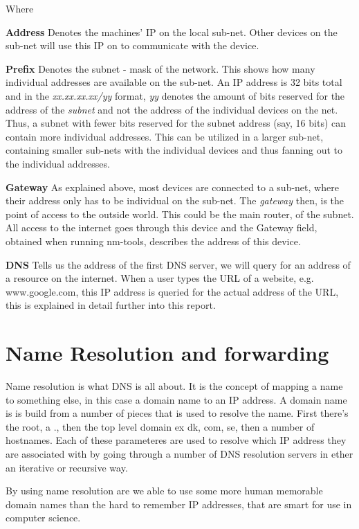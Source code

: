 Where 

\textbf{Address} 
Denotes the machines' IP on the local sub-net. Other devices on the sub-net will use this IP on to communicate with the device.

\textbf{Prefix} 
Denotes the subnet - mask of the network. This shows how many individual addresses are available on the sub-net. An IP address is 32 bits total and in the \textit{xx.xx.xx.xx/yy} format, \textit{yy} denotes the amount of bits reserved for the address of the \textit{subnet} and not the address of the individual devices on the net. Thus, a subnet with fewer bits reserved for the subnet address (say, 16 bits) can contain more individual addresses. This can be utilized in a larger sub-net, containing smaller sub-nets with the individual devices and thus fanning out to the individual addresses. 

\textbf{Gateway}
As explained above, most devices are connected to a sub-net, where their address only has to be individual on the sub-net. The \textit{gateway} then, is the point of access to the outside world. This could be the main router, of the subnet. All access to the internet goes through this device and the Gateway field, obtained when running nm-tools, describes the address of this device. 

\textbf{DNS}
Tells us the address of the first DNS server, we will query for an address of a resource on the internet. When a user types the URL of a website, e.g. www.google.com, this IP address is queried for the actual address of the URL, this is explained in detail further into this report.


\section{Name Resolution and forwarding}
Name resolution is what DNS is all about. It is the concept of mapping a name to something else, in this case a domain name to an IP address. A domain name is is build from a number of pieces that is used to resolve the name. First there's the root, a ., then the top level domain ex dk, com, se, then a number of hostnames. Each of these parameteres are used to resolve which IP address they are associated with by going through a number of DNS resolution servers in ether an iterative or recursive way.

By using name resolution are we able to use some more human memorable domain names than the hard to remember IP addresses, that are smart for use in computer science.

